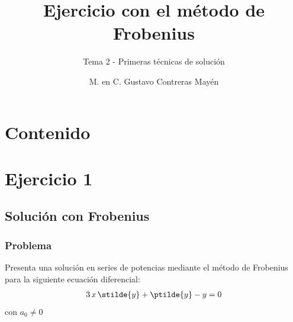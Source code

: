 
\title{\large{Ejercicio con el método de Frobenius}}
\subtitle{Tema 2 - Primeras técnicas de solución}
\author{M. en C. Gustavo Contreras Mayén}
\date{}

\maketitle
\fontsize{14}{14}\selectfont
{}
\section*{Contenido}
\section{Ejercicio 1}
\subsection{Solución con Frobenius}
\begin{frame}
\frametitle{Problema}
Presenta una solución en series de potencias mediante el método de Frobenius para la siguiente ecuación diferencial:
\begin{align*}
3 \, x \, \stilde{y} + \ptilde{y} - y = 0
\end{align*}
con $a_{0} \neq 0$
\end{frame}
